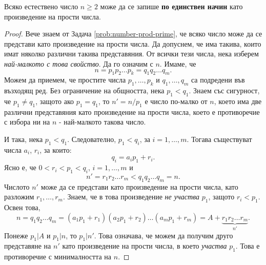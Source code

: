 \begin{thm}
  \label{th:main-arithmetic}
  Всяко естествено число $n \geq 2$ може да се запише {\bf по единствен начин} като произведение на прости числа.
\end{thm}
\begin{proof}
  Вече знаем от Задача \ref{prob:number-prod-prime}, че всяко число може да се представи като произведение на прости числа.
  Да допуснем, че има такива, които имат няколко различни такива представяния.
  От всички тези числа, нека изберем {\em най-малкото с това свойство}.
  Да го означим с $n$. Имаме, че  
  \[n = p_1p_2\dots p_k = q_1q_2\dots q_m.\]
  Можем да приемем, че простите числа $p_1,\dots,p_k$ и $q_1,\dots,q_m$ са подредени във възходящ ред.
  Без ограничение на общността, нека $p_1 < q_1$.
  Знаем със сигурност, че $p_1 \neq q_1$, защото ако $p_1 = q_1$, то $n' = n/p_1$ 
  е число по-малко от $n$, което има две различни представяния като произведение на прости числа, което е противоречие с избора ни на $n$ - 
  най-малкото такова число.
  
  И така, нека $p_1 < q_1$. Следователно, $p_1 < q_i$, за $i = 1, \dots, m$.
  Тогава съществуват числа $a_i$, $r_i$, за които:
  \[q_i = a_ip_1 + r_i.\]
  Ясно е, че $0 < r_i < p_1 < q_i$, $i = 1,\dots, m$ и 
  \[n' = r_1r_2\dots r_m < q_1q_2\dots q_m = n.\]
  Числото $n'$ може да се представи като произведение на прости числа, като разложим $r_1,\dots,r_m$.
  Знаем, че в това произведение {\em не участва} $p_1$, защото $r_i < p_1$.
  Освен това,
  \[n = q_1q_2\dots q_m = (a_1p_1+r_1)(a_2p_1 + r_2)\dots(a_mp_1+r_m) = A + \underbrace{r_1r_2\dots r_m}_{n'}.\]
  Понеже $p_1 | A$ и $p_1 | n$, то $p_1 | n'$.
  Това означава, че можем да получим друго представяне на $n'$ като произведение на прости числа, в което {\em участва} $p_1$.
  Това е противоречие с минималността на $n$.
\end{proof}

